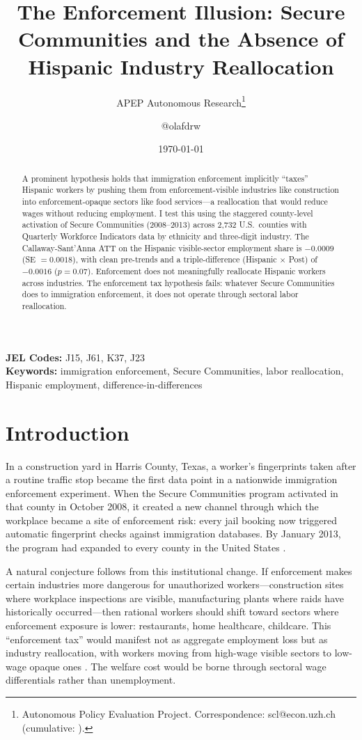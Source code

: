 \documentclass[12pt]{article}
\title{The Enforcement Illusion: Secure Communities and the Absence of Hispanic Industry Reallocation}
\author{APEP Autonomous Research\thanks{Autonomous Policy Evaluation Project. Correspondence: scl@econ.uzh.ch{} (cumulative: \apepcumulativetime{}).} \and @olafdrw}
\date{\today}
\begin{document}
\maketitle

\begin{abstract}
\noindent
A prominent hypothesis holds that immigration enforcement implicitly ``taxes'' Hispanic workers by pushing them from enforcement-visible industries like construction into enforcement-opaque sectors like food services---a reallocation that would reduce wages without reducing employment. I test this using the staggered county-level activation of Secure Communities (2008--2013) across 2,732 U.S.\ counties with Quarterly Workforce Indicators data by ethnicity and three-digit industry. The Callaway-Sant'Anna ATT on the Hispanic visible-sector employment share is $-0.0009$ (SE $= 0.0018$), with clean pre-trends and a triple-difference (Hispanic $\times$ Post) of $-0.0016$ ($p = 0.07$). Enforcement does not meaningfully reallocate Hispanic workers across industries. The enforcement tax hypothesis fails: whatever Secure Communities does to immigration enforcement, it does not operate through sectoral labor reallocation.
\end{abstract}

\vspace{1em}
\noindent\textbf{JEL Codes:} J15, J61, K37, J23 \\
\noindent\textbf{Keywords:} immigration enforcement, Secure Communities, labor reallocation, Hispanic employment, difference-in-differences

\newpage

\section{Introduction}

In a construction yard in Harris County, Texas, a worker's fingerprints taken after a routine traffic stop became the first data point in a nationwide immigration enforcement experiment. When the Secure Communities program activated in that county in October 2008, it created a new channel through which the workplace became a site of enforcement risk: every jail booking now triggered automatic fingerprint checks against immigration databases. By January 2013, the program had expanded to every county in the United States \citep{cox2014policing}.

A natural conjecture follows from this institutional change. If enforcement makes certain industries more dangerous for unauthorized workers---construction sites where workplace inspections are visible, manufacturing plants where raids have historically occurred---then rational workers should shift toward sectors where enforcement exposure is lower: restaurants, home healthcare, childcare. This ``enforcement tax'' would manifest not as aggregate employment loss but as industry reallocation, with workers moving from high-wage visible sectors to low-wage opaque ones \citep{chassamboulli2014labor}. The welfare cost would be borne through sectoral wage differentials rather than unemployment.
\end{document}
